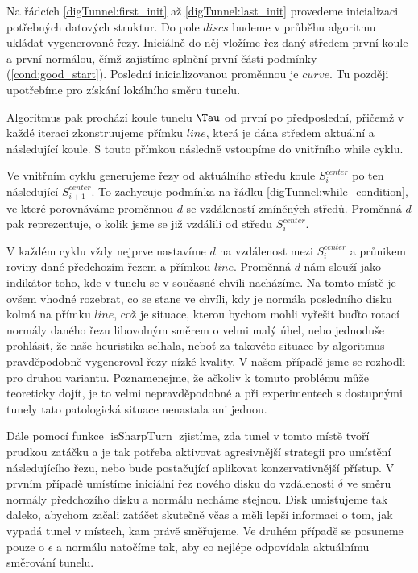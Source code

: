 Na řádcích \ref{digTunnel:first_init} až \ref{digTunnel:last_init} provedeme
inicializaci potřebných datových struktur. Do pole $ discs $ budeme
v průběhu algoritmu ukládat vygenerované řezy. Iniciálně do něj vložíme
řez daný středem první koule a první normálou, čímž zajistíme splnění první
části podmínky (\ref{cond:good_start}). Poslední inicializovanou proměnnou je
$ curve $. Tu později upotřebíme pro získání lokálního směru tunelu.

Algoritmus pak prochází koule tunelu $ \Tau $ od první po předposlední, přičemž
v každé iteraci zkonstruujeme přímku $ line $, která je dána středem aktuální
a následující koule. S touto přímkou následně vstoupíme do vnitřního while cyklu.

Ve vnitřním cyklu generujeme řezy od aktuálního středu koule $ S_{i}^{center} $
po ten následující $ S_{i + 1}^{center} $. To zachycuje podmínka
na řádku \ref{digTunnel:while_condition}, ve které porovnáváme
proměnnou $ d $ se vzdáleností zmíněných středů. Proměnná $ d $ pak reprezentuje,
o kolik jsme se již vzdálili od středu $ S_{i}^{center} $.

V každém cyklu vždy nejprve nastavíme $ d $ na vzdálenost mezi $ S_{i}^{center} $ a
průnikem roviny dané předchozím řezem a přímkou $ line $. Proměnná $ d $ nám
slouží jako indikátor toho, kde v tunelu se v současné chvíli nacházíme.
Na tomto místě je ovšem vhodné rozebrat, co se stane ve chvíli, kdy je normála
posledního disku kolmá na přímku $ line $, což je situace, kterou bychom mohli
vyřešit buďto rotací normály daného řezu libovolným směrem o velmi malý úhel,
nebo jednoduše prohlásit, že naše heuristika selhala, neboť za
takovéto situace by algoritmus pravděpodobně vygeneroval řezy nízké kvality.
V našem případě jsme se rozhodli pro druhou variantu.
Poznamenejme, že ačkoliv k tomuto problému může teoreticky dojít, je to
velmi nepravděpodobné a při experimentech s dostupnými tunely tato patologická
situace nenastala ani jednou.

Dále pomocí funkce $ \operatorname{isSharpTurn} $ zjistíme, zda tunel v tomto
místě tvoří prudkou zatáčku a je tak potřeba aktivovat agresivnější strategii pro
umístění následujícího řezu, nebo bude postačující aplikovat konzervativnější
přístup. V prvním případě umístíme iniciální řez nového disku do vzdálenosti
$ \delta $ ve směru normály předchozího disku a normálu necháme stejnou. Disk
umisťujeme tak daleko, abychom začali zatáčet skutečně včas a měli lepší
informaci o tom, jak vypadá tunel v místech, kam právě směřujeme. Ve druhém případě
se posuneme pouze o $ \epsilon $ a normálu natočíme tak, aby co nejlépe odpovídala
aktuálnímu směrování tunelu.

